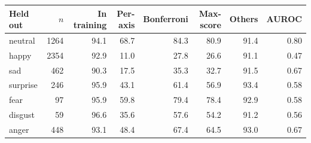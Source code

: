 \begin{tabular}{lrrrrrrr}
\toprule
Held out & $n$ & In training & Per-axis & Bonferroni & Max-score & Others & AUROC \\
\midrule
neutral & 1264 & 94.1 & 68.7 & 84.3 & 80.9 & 91.4 & 0.80 \\
happy & 2354 & 92.9 & 11.0 & 27.8 & 26.6 & 91.1 & 0.47 \\
sad & 462 & 90.3 & 17.5 & 35.3 & 32.7 & 91.5 & 0.67 \\
surprise & 246 & 95.9 & 43.1 & 61.4 & 56.9 & 93.4 & 0.58 \\
fear & 97 & 95.9 & 59.8 & 79.4 & 78.4 & 92.9 & 0.58 \\
disgust & 59 & 96.6 & 35.6 & 57.6 & 54.2 & 91.2 & 0.56 \\
anger & 448 & 93.1 & 48.4 & 67.4 & 64.5 & 93.0 & 0.67 \\
\bottomrule
\end{tabular}
